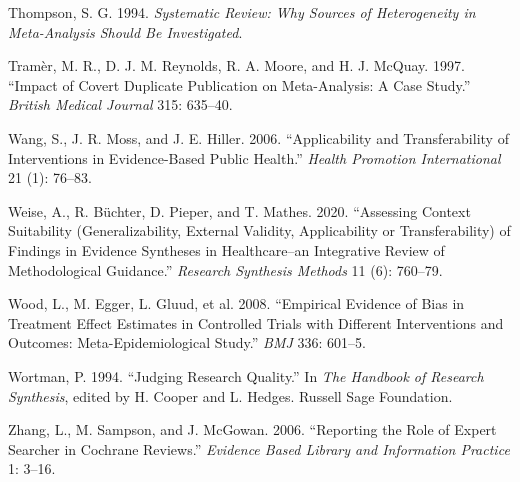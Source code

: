 \documentclass[
  letterpaper,
  DIV=11,
  numbers=noendperiod]{scrreprt}
\newlength{\cslhangindent}
\newenvironment{CSLReferences}[2] %
 {\begin{list}{}{%
  \setlength{\itemindent}{0pt}
  \setlength{\leftmargin}{0pt}
  \setlength{\parsep}{0pt}
  \ifodd #1
   \setlength{\leftmargin}{\cslhangindent}
   \setlength{\itemindent}{-1\cslhangindent}
  \fi
  \setlength{\itemsep}{#2\baselineskip}}}
 {\end{list}}
\begin{document}
\begin{CSLReferences}{1}{1}
Thompson, S. G. 1994. \emph{Systematic Review: Why Sources of
Heterogeneity in Meta-Analysis Should Be Investigated}.

Tramèr, M. R., D. J. M. Reynolds, R. A. Moore, and H. J. McQuay. 1997.
{``Impact of Covert Duplicate Publication on Meta-Analysis: A Case
Study.''} \emph{British Medical Journal} 315: 635--40.

Wang, S., J. R. Moss, and J. E. Hiller. 2006. {``Applicability and
Transferability of Interventions in Evidence-Based Public Health.''}
\emph{Health Promotion International} 21 (1): 76--83.

Weise, A., R. Büchter, D. Pieper, and T. Mathes. 2020. {``Assessing
Context Suitability (Generalizability, External Validity, Applicability
or Transferability) of Findings in Evidence Syntheses in Healthcare--an
Integrative Review of Methodological Guidance.''} \emph{Research
Synthesis Methods} 11 (6): 760--79.

{Wood, L., M. Egger, L. Gluud, et al.} 2008. {``Empirical Evidence of
Bias in Treatment Effect Estimates in Controlled Trials with Different
Interventions and Outcomes: Meta-Epidemiological Study.''} \emph{BMJ}
336: 601--5.

Wortman, P. 1994. {``Judging Research Quality.''} In \emph{The Handbook
of Research Synthesis}, edited by H. Cooper and L. Hedges. Russell Sage
Foundation.

Zhang, L., M. Sampson, and J. McGowan. 2006. {``Reporting the Role of
Expert Searcher in Cochrane Reviews.''} \emph{Evidence Based Library and
Information Practice} 1: 3--16.

\end{CSLReferences}
\end{document}
